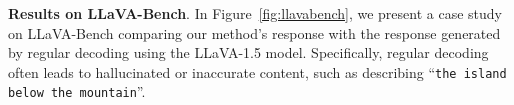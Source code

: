 

\textbf{Results on LLaVA-Bench}. In Figure~\ref{fig:llavabench}, we present a case study on LLaVA-Bench comparing our method's response with the response generated by regular decoding using the LLaVA-1.5 model. Specifically, regular decoding often leads to hallucinated or inaccurate content, such as describing ``\texttt{the island below the mountain}''. 
